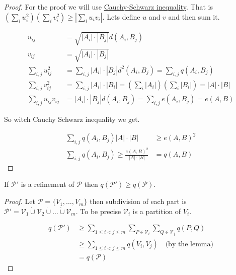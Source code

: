 \begin{proof}
	For the proof we will use \href{https://en.wikipedia.org/wiki/Cauchy%E2%80%93Schwarz_inequality}{Cauchy-Schwarz inequality}. That is $\left( \sum_i u_i^2 \right) \left( \sum_i v_i^2 \right) \geq \left| \sum_i u_i v_i \right|$. Lets define $u$ and $v$ and then sum it.
	
	$$
	\begin{aligned}
		u_{ij} &= \sqrt{|A_i| \cdot |B_j|} d(A_i, B_j) \\
		v_{ij} &= \sqrt{|A_i| \cdot |B_j|} \\
		\sum_{i,j} u_{ij}^2 &= \sum_{i,j} |A_i| \cdot |B_j| d^2(A_i, B_j) = \sum_{i,j} q(A_i, B_j) \\
		\sum_{i,j} v_{ij}^2 &= \sum_{i,j} |A_i| \cdot |B_i| = \left( \sum_i |A_i| \right) \left( \sum_i |B_i| \right) = |A| \cdot |B| \\
		\sum_{i,j} u_{ij} v_{ij} &= |A_i| \cdot |B_j| d(A_i, B_j) = \sum_{i,j} e(A_i, B_j) = e(A,B)
	\end{aligned}
	$$
	
	So witch Cauchy Schwarz inequality we get.
	
	$$
	\begin{aligned}
		\sum_{i,j} q(A_i, B_j) |A| \cdot |B| & \geq e(A,B)^2 \\
		\sum_{i,j} q(A_i, B_j) \geq \frac{e(A,B)^2}{|A| \cdot |B|} &= q(A,B)
	\end{aligned}
	$$
\end{proof}

\begin{lemma}
	If $\mathcal{P}'$ is a refinement of $\mathcal{P}$ then $q(\mathcal{P}') \geq q(\mathcal{P})$.
\end{lemma}

\begin{proof}
	Let $\mathcal{P} = \{V_1, \dots, V_m\}$ then subdivision of each part is $\mathcal{P}' = \mathcal{V}_1 \dot{\cup} \mathcal{V}_2 \dot{\cup} \dots \dot{\cup} \mathcal{V}_m$. To be precise $\mathcal{V}_i$ is a partition of $V_i$.
	
	$$
	\begin{aligned}
		q(\mathcal{P}') &\geq \sum_{1 \leq i < j \leq m} \sum_{P \in \mathcal{V}_i} \sum_{Q \in \mathcal{V}_j} q(P,Q) \\
		 &\geq \sum_{1 \leq i < j \leq m} q(V_i, V_j) \quad \text{(by the lemma)} \\
		 &= q(\mathcal{P})
	\end{aligned}
	$$
\end{proof}

